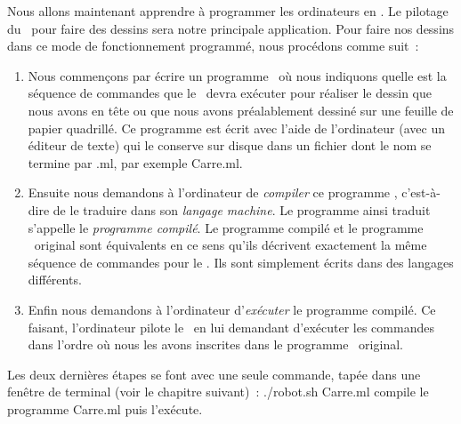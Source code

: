 Nous allons maintenant apprendre à programmer les ordinateurs
en \ocaml. Le pilotage du \robot\ pour faire des dessins sera notre 
principale application. Pour faire nos dessins dans
ce mode de fonctionnement programmé, nous procédons comme suit~:
\begin{enumerate}
\item Nous commençons par écrire un programme \ocaml\ où nous 
in\-di\-quons quelle est la séquence de commandes que le \robot\ devra 
exécuter pour réaliser le dessin que nous avons en tête ou que
nous avons pré\-a\-la\-ble\-ment dessiné sur une feuille de papier
quadrillé. Ce programme est écrit avec l'aide de l'ordinateur
(avec un éditeur de texte) qui le conserve sur disque dans un fichier dont le nom se termine 
par {\idt .ml}, par exemple {\idt Carre.ml}.
\item  Ensuite nous demandons à l'ordinateur de {\em compiler} ce 
programme \ocaml, c'est-à-dire de le traduire dans son 
{\em langage machine}.
Le programme ainsi traduit s'appelle le {\em programme compilé}. 
Le programme compilé et le programme
\ocaml\ ori\-gi\-nal sont équivalents en ce sens qu'ils décrivent 
exactement la même séquence de commandes pour le \robot. Ils sont
simplement écrits dans des langages différents.
\item  Enfin nous demandons à l'ordinateur  d'{\em exécuter} le 
programme compilé. Ce faisant, l'ordinateur pilote le \robot\ en lui
demandant d'exé\-cu\-ter les commandes dans l'ordre où nous les avons 
inscrites dans le programme \ocaml\ ori\-gi\-nal. 
\end{enumerate}
Les deux dernières étapes se font avec une seule commande, tapée dans
une fenêtre de terminal (voir le chapitre suivant)~:
{\idt ./robot.sh Carre.ml} compile le programme {\idt Carre.ml} puis l'exécute.

